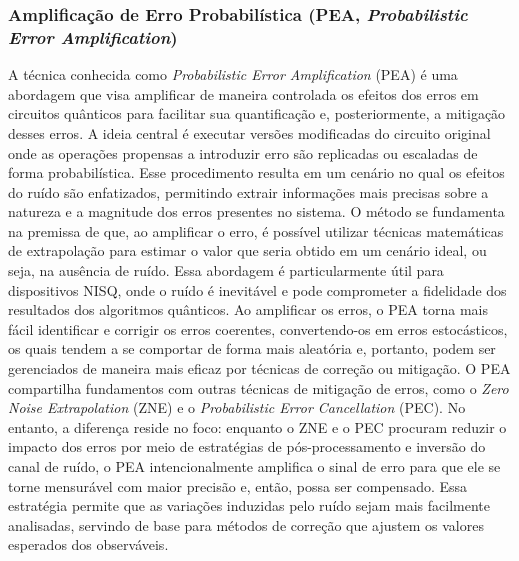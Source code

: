 \subsubsection*{Amplificaç\~{a}o de Erro Probabil\'{i}stica (PEA, \textit{Probabilistic Error Amplification})}
\label{subSubSec: pea}

A t\'{e}cnica conhecida como \textit{Probabilistic Error Amplification} (PEA) \'{e} uma abordagem que visa amplificar de maneira controlada os efeitos dos erros em circuitos qu\^{a}nticos para facilitar sua quantificaç\~{a}o e, posteriormente, a mitigaç\~{a}o desses erros. A ideia central \'{e} executar vers\~{o}es modificadas do circuito original onde as operaç\~{o}es propensas a introduzir erro s\~{a}o replicadas ou escaladas de forma probabil\'{i}stica. Esse procedimento resulta em um cen\'{a}rio no qual os efeitos do ru\'{i}do s\~{a}o enfatizados, permitindo extrair informaç\~{o}es mais precisas sobre a natureza e a magnitude dos erros presentes no sistema.
O m\'{e}todo se fundamenta na premissa de que, ao amplificar o erro, \'{e} poss\'{i}vel utilizar t\'{e}cnicas matem\'{a}ticas de extrapolaç\~{a}o para estimar o valor que seria obtido em um cen\'{a}rio ideal, ou seja, na aus\^{e}ncia de ru\'{i}do. Essa abordagem \'{e} particularmente \'{u}til para dispositivos NISQ, onde o ru\'{i}do \'{e} inevit\'{a}vel e pode comprometer a fidelidade dos resultados dos algoritmos qu\^{a}nticos. Ao amplificar os erros, o PEA torna mais f\'{a}cil identificar e corrigir os erros coerentes, convertendo-os em erros estoc\'{a}sticos, os quais tendem a se comportar de forma mais aleatória e, portanto, podem ser gerenciados de maneira mais eficaz por t\'{e}cnicas de correç\~{a}o ou mitigaç\~{a}o.
O PEA compartilha fundamentos com outras t\'{e}cnicas de mitigaç\~{a}o de erros, como o \textit{Zero Noise Extrapolation} (ZNE) e o \textit{Probabilistic Error Cancellation} (PEC). No entanto, a diferença reside no foco: enquanto o ZNE e o PEC procuram reduzir o impacto dos erros por meio de estrat\'{e}gias de pós-processamento e invers\~{a}o do canal de ru\'{i}do, o PEA intencionalmente amplifica o sinal de erro para que ele se torne mensur\'{a}vel com maior precis\~{a}o e, ent\~{a}o, possa ser compensado. Essa estrat\'{e}gia permite que as variaç\~{o}es induzidas pelo ru\'{i}do sejam mais facilmente analisadas, servindo de base para m\'{e}todos de correç\~{a}o que ajustem os valores esperados dos observ\'{a}veis.
